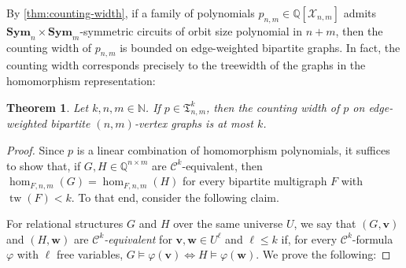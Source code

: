 \documentclass[11pt, DIV=15]{scrarticle}
\theoremstyle{definition}
\theoremstyle{plain}
\newtheorem{theorem}[definition]{Theorem}
\theoremstyle{remark}
\DeclareMathOperator{\tw}{tw}
\renewcommand{\phi}{\varphi}
\newcommand{\Sym}{\mathbf{Sym}}
\begin{document}
	
	
	By \cref{thm:counting-width}, if a family of polynomials $p_{n,m} \in \mathbb{Q}[\mathcal{X}_{n,m}]$ admits $\Sym_n\times \Sym_m$-symmetric circuits of orbit size polynomial in $n+m$,
	then the counting width of $p_{n,m}$ is bounded on edge-weighted bipartite graphs.
	In fact, the counting width corresponds precisely to the treewidth of the graphs in the homomorphism representation:
	\begin{theorem}\label{thm:counting-width-explicit}
		Let $k,n,m \in \mathbb{N}$. If $p \in \mathfrak{T}^k_{n,m}$,
		then the counting width of $p$ on edge-weighted bipartite $(n,m)$-vertex graphs is at most $k$.
	\end{theorem}
	\begin{proof}
		Since $p$ is a linear combination of homomorphism polynomials,
		it suffices to show that, if $G, H \in \mathbb{Q}^{n\times m}$ are $\mathcal{C}^k$-equivalent, then $\hom_{F, n,m}(G) = \hom_{F, n,m}(H)$ for every bipartite multigraph $F$ with $\tw(F) < k$.
		To that end, consider the following claim.

		For relational structures $G$ and $H$ over the same universe $U$,
		we say that $(G,\boldsymbol{v})$  and $(H,\boldsymbol{w})$ are \emph{$\mathcal{C}^k$-equivalent} for $\boldsymbol{v},\boldsymbol{w} \in U^\ell$ and $\ell \leq k$
		if, for every $\mathcal{C}^k$-formula $\phi$ with $\ell$ free variables, $G\models \phi(\boldsymbol{v}) \iff H \models \phi(\boldsymbol{w})$.
		We prove the following:
		

\end{proof}
\end{document}
